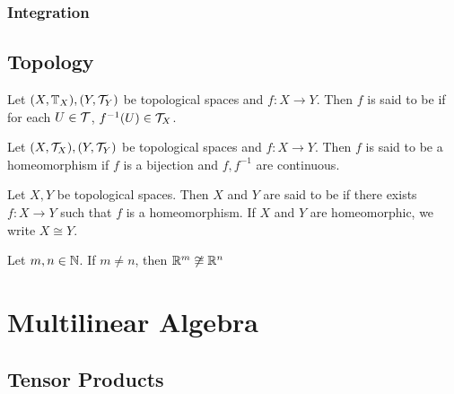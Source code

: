 \documentclass{book}
\begin{document}
	
	
	\subsection{Integration}














\newpage
\section{Topology}

\begin{defn}
Let $(X, \mathbb{T}_X), (Y, \mathcal{T}_Y)$ be topological spaces and $f:X\rightarrow Y$. Then $f$ is said to be  if for each $U \in \mathcal{T}$, $f^{-1}(U) \in \mathcal{T}_X$.
\end{defn}

\begin{defn}
Let $(X, \mathcal{T}_X), (Y, \mathcal{T}_Y)$ be topological spaces and $f:X\rightarrow Y$. Then $f$ is said to be a homeomorphism if $f$ is a bijection and $f, f^{-1}$ are continuous. 
\end{defn}

\begin{defn}
Let $X, Y$ be topological spaces. Then $X$ and $Y$ are said to be  if there exists $f:X \rightarrow Y$ such that $f$ is a homeomorphism. If $X$ and $Y$ are homeomorphic, we write $X \cong Y$. 
\end{defn}

\begin{thm}
Let $m,n \in \mathbb{N}$. If $m \neq n$, then $\mathbb{R}^m \not \cong \mathbb{R}^n$
\end{thm}






















\newpage
	\chapter{Multilinear Algebra}
	
	\section{Tensor Products}
	
\end{document}
